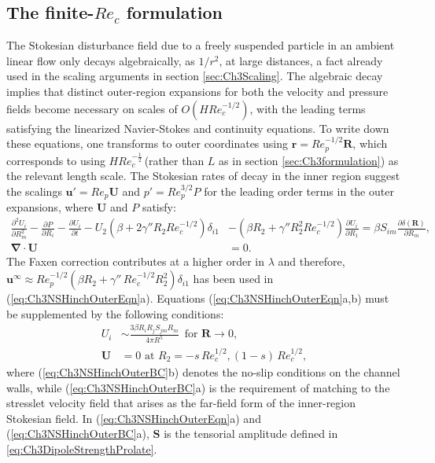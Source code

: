 \documentclass{jfm}
\begin{document}
\subsection{The finite-$Re_c$ formulation}\label{sec:finiteRecformulation}

The Stokesian disturbance field due to a freely suspended particle in an ambient linear flow only decays algebraically, as $1/r^2$, at large distances, a fact already used in the scaling arguments in section \ref{sec:Ch3Scaling}. The algebraic decay implies that distinct outer-region expansions for both the velocity and pressure fields become necessary on scales of $O(HRe_c^{-1/2})$, with the leading terms satisfying the linearized Navier-Stokes and continuity equations. To write down these equations, one transforms to outer coordinates using $\bm{r}=Re_p^{-1/2}\bm{R}$, which corresponds to using $HRe_c^{-\frac{1}{2}}$\,(rather than $L$ as in section \ref{sec:Ch3formulation}) as the relevant length scale. The Stokesian rates of decay in the inner region suggest the scalings $\bm{u}'=Re_p\bm{U}$ and $p'=Re_p^{3/2} P$ for the leading order terms in the outer expansions, where $\bm{U}$ and $P$ satisfy:  
\begin{subequations} 
	\begin{align} 
	\frac{\partial^2 U_i}{\partial R_m^2}-\frac{\partial P}{\partial R_i}-\frac{\partial U_i}{\partial t}-U_2(\beta+2\gamma''R_2 Re_c^{-1/2})\delta_{i1}&-(\beta R_2+\gamma''R_2^2 Re_c^{-1/2})\frac{\partial U_i}{\partial R_1}=\beta S_{im}\frac{\partial\delta(\bm{R})}{\partial R_m},\\
	\bm{\nabla}\cdot \bm{U}&=0.
	\end{align} \label{eq:Ch3NSHinchOuterEqn}
\end{subequations}
 The Faxen correction contributes at a higher order in $\lambda$ and therefore, $\bm{u}^\infty\approx Re_p^{-1/2}(\beta R_2+\gamma''\,Re_c^{-1/2} R_2^2) \delta_{i1}$ has been used in (\ref{eq:Ch3NSHinchOuterEqn}a).
Equations (\ref{eq:Ch3NSHinchOuterEqn}a,b) must be supplemented by the following conditions: 
\begin{subequations} 
	\begin{align} 
	U_i &\sim \frac{3\beta R_i R_j S_{jm}R_m}{4\pi R^5} \frac{}{} \text{ for } \bm{R}\rightarrow 0, \\
	\bm{U}&=0 \text{ at } R_2=-s\,Re_c^{1/2}, (1-s)\,Re_c^{1/2},
	\end{align} \label{eq:Ch3NSHinchOuterBC}
\end{subequations}
where (\ref{eq:Ch3NSHinchOuterBC}b) denotes the no-slip conditions on the channel walls, while (\ref{eq:Ch3NSHinchOuterBC}a) is the requirement of matching to the stresslet velocity field that arises as the far-field form of the inner-region Stokesian field. In (\ref{eq:Ch3NSHinchOuterEqn}a) and (\ref{eq:Ch3NSHinchOuterBC}a),  $\bm{S}$ is the tensorial amplitude defined in \eqref{eq:Ch3DipoleStrengthProlate}.
\end{document}
